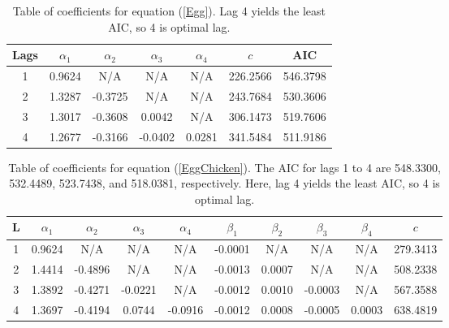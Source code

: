 \documentclass[]{article}
\begin{document}
\begin{table}
	\begin{center}
		\begin{tabular}{ | c | c c c c c | c | }
			\hline
			Lags & $\alpha_1$ &  $\alpha_2$& $\alpha_3$ & $\alpha_4$ & $c$ & AIC  \\ \hline 
			1 & 0.9624 & N/A & N/A & N/A & 226.2566 & 546.3798 \\  \hline 
			2 & 1.3287 & -0.3725 & N/A & N/A & 243.7684 & 530.3606 \\  \hline
			3 & 1.3017 & -0.3608 & 0.0042 & N/A & 306.1473 & 519.7606 \\  \hline
			4 & 1.2677 & -0.3166 & -0.0402 & 0.0281 & 341.5484
			& 511.9186 \\  \hline
		\end{tabular}
		\caption{Table of coefficients for equation (\ref{Egg}). Lag 4 yields the least AIC, so 4 is optimal lag.}
	\end{center}
\end{table}

\begin{table}
	\begin{tabular}{ | c | c c c c c c c c c |}
		\hline
		L & $\alpha_1$ &  $\alpha_2$& $\alpha_3$ & $\alpha_4$ & $\beta_1$ &  $\beta_2$& $\beta_3$ & $\beta_4$  & $c$  \\ \hline 
		1 & 0.9624 & N/A & N/A & N/A & -0.0001 & N/A & N/A & N/A & 279.3413 \\  \hline 
		2 & 1.4414 & -0.4896 & N/A & N/A & -0.0013 & 0.0007 & N/A & N/A & 508.2338  \\  \hline 
		3 & 1.3892 & -0.4271 & -0.0221 & N/A & -0.0012 & 0.0010 & -0.0003 & N/A & 567.3588 \\  \hline 
		4 & 1.3697 & -0.4194 & 0.0744 & -0.0916 & -0.0012 & 0.0008 & -0.0005 & 0.0003 & 638.4819 \\  \hline 
	\end{tabular}
	\caption{Table of coefficients for equation (\ref{EggChicken}). The AIC for lags 1 to 4 are 548.3300, 532.4489, 523.7438, and 518.0381, respectively. Here, lag 4 yields the least AIC, so 4 is optimal lag.}
\end{table}
\end{document}
